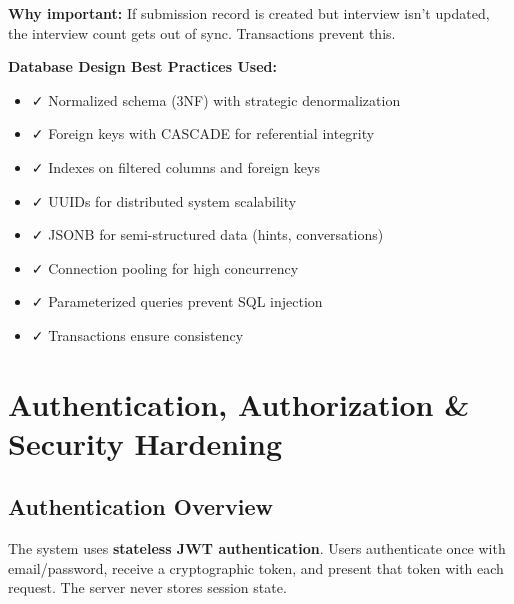 \documentclass[12pt,a4paper,oneside]{article}
\begin{document}
\textbf{Why important:} If submission record is created but interview isn't updated, the interview count gets out of sync. Transactions prevent this.

\begin{importantbox}
\textbf{Database Design Best Practices Used:}

\begin{itemize}
    \item ✓ Normalized schema (3NF) with strategic denormalization
    \item ✓ Foreign keys with CASCADE for referential integrity
    \item ✓ Indexes on filtered columns and foreign keys
    \item ✓ UUIDs for distributed system scalability
    \item ✓ JSONB for semi-structured data (hints, conversations)
    \item ✓ Connection pooling for high concurrency
    \item ✓ Parameterized queries prevent SQL injection
    \item ✓ Transactions ensure consistency
\end{itemize}
\end{importantbox}

\newpage


\section{Authentication, Authorization \& Security Hardening}

\subsection{Authentication Overview}

The system uses \textbf{stateless JWT authentication}. Users authenticate once with email/password, receive a cryptographic token, and present that token with each request. The server never stores session state.
\end{document}
